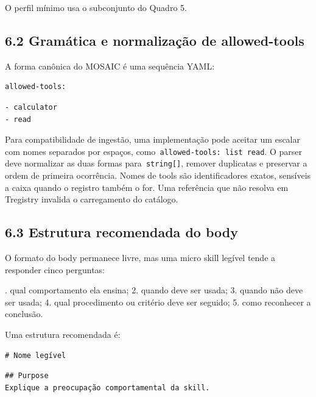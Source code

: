 \documentclass[12pt,a4paper]{article}
\begin{document}
O perfil mínimo usa o subconjunto do Quadro 5.





\subsection*{6.2 Gramática e normalização de allowed-tools}

A forma canônica do MOSAIC é uma sequência YAML:


\begin{Verbatim}[breaklines=true,breakanywhere=true,fontsize=\small]
allowed-tools:
\end{Verbatim}

\begin{Verbatim}[breaklines=true,breakanywhere=true,fontsize=\small]
- calculator
- read
\end{Verbatim}

Para compatibilidade de ingestão, uma implementação pode aceitar um escalar com nomes separados por espaços, como\texttt{ allowed-tools: list read}. O parser deve normalizar as duas formas para\texttt{ string[]}, remover duplicatas e preservar a ordem de primeira ocorrência. Nomes de tools são identificadores exatos, sensíveis a caixa quando o registro também o for. Uma referência que não resolva em Tregistry invalida o carregamento do catálogo.


\subsection*{6.3 Estrutura recomendada do body}

O formato do body permanece livre, mas uma micro skill legível tende a responder cinco perguntas:


. qual comportamento ela ensina; 2. quando deve ser usada; 3. quando não deve ser usada; 4. qual procedimento ou critério deve ser seguido; 5. como reconhecer a conclusão.\par

Uma estrutura recomendada é:


\begin{Verbatim}[breaklines=true,breakanywhere=true,fontsize=\small]
# Nome legível
\end{Verbatim}


\begin{Verbatim}[breaklines=true,breakanywhere=true,fontsize=\small]
## Purpose
Explique a preocupação comportamental da skill.
\end{Verbatim}
\end{document}
